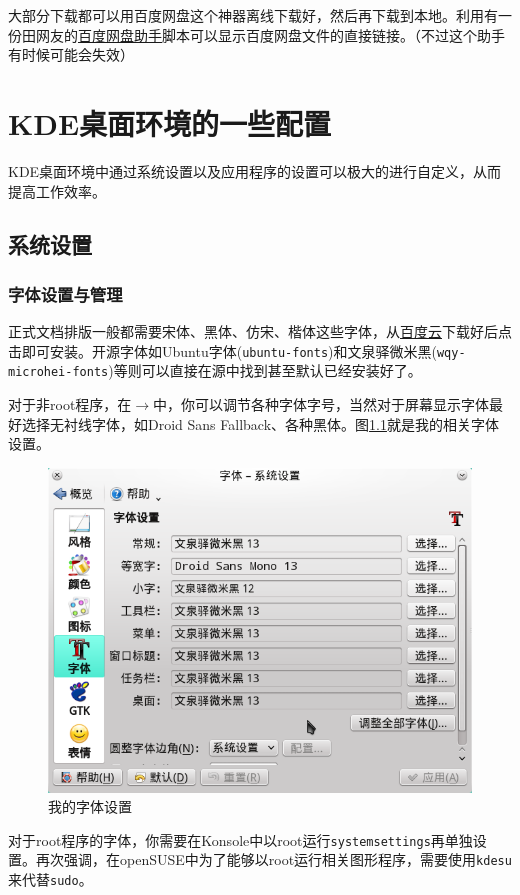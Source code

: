 \documentclass[11pt,openany]{book}
\newcommand{\command}[1]{\texttt{\textcolor{codec}{#1}}}
\newcommand{\soft}[1]{\texttt{\textcolor{dgreen}{#1}}}
\newcommand{\menu}[1]{\fbox{#1}}
\newcommand{\me}{$\rightarrow$}
\begin{document}
大部分下载都可以用百度网盘这个神器离线下载好，然后再下载到本地。利用有一份田网友的\href{http://git.oschina.net/youyifentian/dupanlink}{百度网盘助手}脚本可以显示百度网盘文件的直接链接。（不过这个助手有时候可能会失效）
\chapter{KDE桌面环境的一些配置}
KDE桌面环境中通过系统设置以及应用程序的设置可以极大的进行自定义，从而提高工作效率。
\section{系统设置}
\subsection{字体设置与管理}
正式文档排版一般都需要宋体、黑体、仿宋、楷体这些字体，从\href{http://pan.baidu.com/s/1mgiHWmO}{百度云}下载好后点击即可安装。开源字体如Ubuntu字体(\soft{ubuntu-fonts})和文泉驿微米黑(\soft{wqy-microhei-fonts})等则可以直接在源中找到甚至默认已经安装好了。

对于非root程序，在\menu{应用程序外观}\me\menu{字体设置}中，你可以调节各种字体字号，当然对于屏幕显示字体最好选择无衬线字体，如Droid Sans Fallback、各种黑体。图\ref{myfont}就是我的相关字体设置。
\begin{figure}[htbp]
 \centering
 \includegraphics[width=\textwidth]{./pic/fontsettings.png}
 \caption{我的字体设置}\label{myfont}
\end{figure}

对于root程序的字体，你需要在Konsole中以root运行\command{systemsettings}再单独设置。再次强调，在openSUSE中为了能够以root运行相关图形程序，需要使用\command{kdesu}来代替\command{sudo}。
\end{document}
